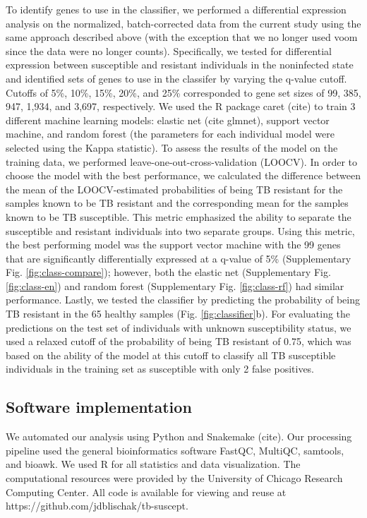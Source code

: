 \documentclass[fleqn,10pt]{wlscirep}
\begin{document}
To identify genes to use in the classifier, we performed a
differential expression analysis on the normalized, batch-corrected
data from the current study using the same approach described above
(with the exception that we no longer used voom since the data were no
longer counts). Specifically, we tested for differential expression
between susceptible and resistant individuals in the noninfected state
and identified sets of genes to use in the classifer by varying the
q-value cutoff. Cutoffs of 5\%, 10\%, 15\%, 20\%, and 25\%
corresponded to gene set sizes of 99, 385, 947, 1,934, and 3,697,
respectively. We used the R package caret (cite) to train 3 different
machine learning models: elastic net (cite glmnet), support vector
machine, and random forest (the parameters for each individual model
were selected using the Kappa statistic). To assess the results of the
model on the training data, we performed
leave-one-out-cross-validation (LOOCV). In order to choose the model
with the best performance, we calculated the difference between the
mean of the LOOCV-estimated probabilities of being TB resistant for
the samples known to be TB resistant and the corresponding mean for
the samples known to be TB susceptible. This metric emphasized the
ability to separate the susceptible and resistant individuals into two
separate groups. Using this metric, the best performing model was the
support vector machine with the 99 genes that are significantly
differentially expressed at a q-value of 5\% (Supplementary Fig.
\ref{fig:class-compare}); however, both the elastic net (Supplementary
Fig. \ref{fig:class-en}) and random forest (Supplementary Fig.
\ref{fig:class-rf}) had similar performance. Lastly, we tested the
classifier by predicting the probability of being TB resistant in the
65 healthy samples (Fig. \ref{fig:classifier}b). For evaluating the
predictions on the test set of individuals with unknown susceptibility
status, we used a relaxed cutoff of the probability of being TB
resistant of 0.75, which was based on the ability of the model at this
cutoff to classify all TB susceptible individuals in the training set
as susceptible with only 2 false positives.
\subsection*{Software implementation}

We automated our analysis using Python and Snakemake (cite). Our
processing pipeline used the general bioinformatics software FastQC,
MultiQC, samtools, and bioawk. We used R for all statistics and data
visualization. The computational resources were provided by the
University of Chicago Research Computing Center. All code is available
for viewing and reuse at https://github.com/jdblischak/tb-suscept.
\end{document}
